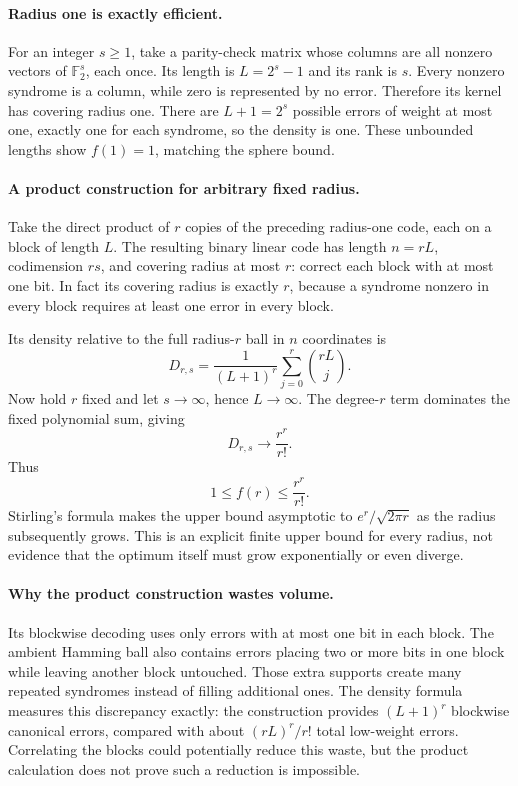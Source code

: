 \documentclass[11pt,a4paper]{article}
\newcommand{\F}{\mathbb{F}}
\begin{document}
\paragraph{Radius one is exactly efficient.}
For an integer $s\geq1$, take a parity-check matrix whose columns are all nonzero vectors of $\F_2^s$, each once. Its length is $L=2^s-1$ and its rank is $s$. Every nonzero syndrome is a column, while zero is represented by no error. Therefore its kernel has covering radius one. There are $L+1=2^s$ possible errors of weight at most one, exactly one for each syndrome, so the density is one. These unbounded lengths show $f(1)=1$, matching the sphere bound.

\paragraph{A product construction for arbitrary fixed radius.}
Take the direct product of $r$ copies of the preceding radius-one code, each on a block of length $L$. The resulting binary linear code has length $n=rL$, codimension $rs$, and covering radius at most $r$: correct each block with at most one bit. In fact its covering radius is exactly $r$, because a syndrome nonzero in every block requires at least one error in every block.

Its density relative to the full radius-$r$ ball in $n$ coordinates is
\[
 D_{r,s}=\frac{1}{(L+1)^r}\sum_{j=0}^r\binom{rL}{j}.
\]
Now hold $r$ fixed and let $s\to\infty$, hence $L\to\infty$. The degree-$r$ term dominates the fixed polynomial sum, giving
\[
 D_{r,s}\longrightarrow\frac{r^r}{r!}.
\]
Thus
\[
 1\leq f(r)\leq\frac{r^r}{r!}.
\]
Stirling's formula makes the upper bound asymptotic to $e^r/\sqrt{2\pi r}$ as the radius subsequently grows. This is an explicit finite upper bound for every radius, not evidence that the optimum itself must grow exponentially or even diverge.

\paragraph{Why the product construction wastes volume.}
Its blockwise decoding uses only errors with at most one bit in each block. The ambient Hamming ball also contains errors placing two or more bits in one block while leaving another block untouched. Those extra supports create many repeated syndromes instead of filling additional ones. The density formula measures this discrepancy exactly: the construction provides $(L+1)^r$ blockwise canonical errors, compared with about $(rL)^r/r!$ total low-weight errors. Correlating the blocks could potentially reduce this waste, but the product calculation does not prove such a reduction is impossible.
\end{document}
